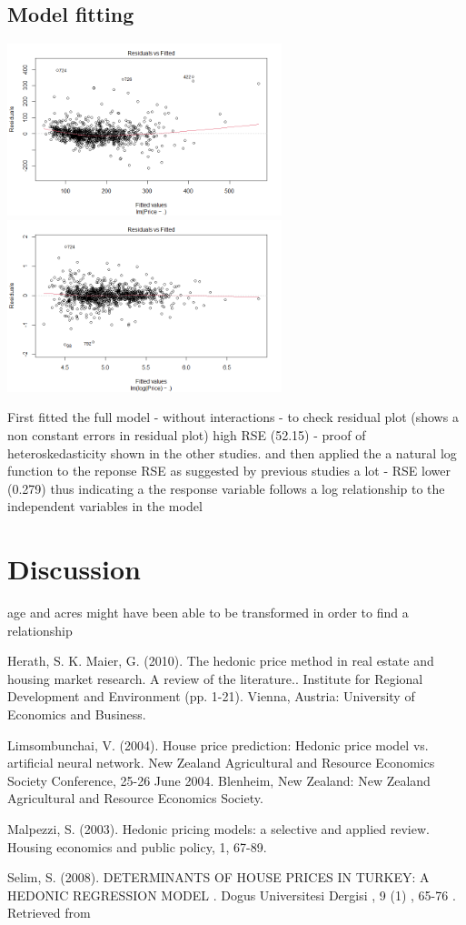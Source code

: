 \documentclass[10pt,A4,makeidx]{article}
\begin{document}
  \subsection{Model fitting}
  \begin{center}
    \includegraphics[width=8cm]{full-res.png}
    \includegraphics[width=8cm]{full-resln.png}
  \end{center}
  First fitted the full model - without interactions - to check residual plot
  (shows a non constant errors in residual plot) high RSE (52.15) - proof of 
  heteroskedasticity shown in the other studies.
  and then applied the  a natural log function to the reponse RSE as suggested by
  previous studies a lot - RSE lower (0.279) thus indicating a the response variable
  follows a log relationship to the independent variables in the model
\section{Discussion}
age and acres might have been able to be transformed in order to find a relationship


\begin{thebibliography}{9}
Herath, S. K. Maier, G. (2010). The hedonic price method in real estate and housing market research. A review of the literature.. Institute for Regional Development and Environment (pp. 1-21). Vienna, Austria: University of Economics and Business.

Limsombunchai, V. (2004). House price prediction: Hedonic price model vs. artificial neural network. New Zealand Agricultural and Resource Economics Society Conference, 25-26 June 2004. Blenheim, New Zealand: New Zealand Agricultural and Resource Economics Society.

Malpezzi, S. (2003). Hedonic pricing models: a selective and applied review. Housing economics and public policy, 1, 67-89.

Selim, S. (2008). DETERMINANTS OF HOUSE PRICES IN TURKEY: A HEDONIC REGRESSION MODEL . Dogus Universitesi Dergisi , 9 (1) , 65-76 . Retrieved from 
\end{thebibliography}
\end{document}
